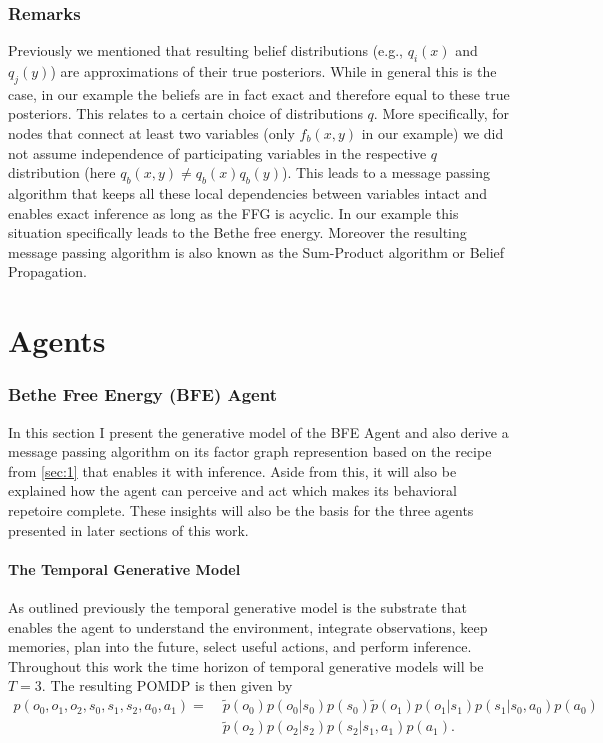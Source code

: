 \subsection{Remarks}
Previously we mentioned that resulting belief distributions (e.g., \(q_i(x)\) and \(q_j(y)\)) are approximations of their true posteriors. While in general this is the case, in our example the beliefs are in fact exact and therefore equal to these true posteriors. This relates to a certain choice of distributions \(q\). More specifically, for nodes that connect at least two variables (only \(f_b(x,y)\) in our example) we did not assume independence of participating variables in the respective \(q\) distribution (here \(q_b(x,y) \neq q_b(x)q_b(y)\)). This leads to a message passing algorithm that keeps all these local dependencies between variables intact and enables exact inference as long as the FFG is acyclic. In our example this situation specifically leads to the Bethe free energy. Moreover the resulting message passing algorithm is also known as the Sum-Product algorithm or Belief Propagation.


\chapter{Agents}

\subsection{Bethe Free Energy (BFE) Agent}

In this section I present the generative model of the BFE Agent and also derive a message passing algorithm on its factor graph represention based on the recipe from \cref{sec:1} that enables it with inference. Aside from this, it will also be explained how the agent can perceive and act which makes its behavioral repetoire complete. These insights will also be the basis for the three agents presented in later sections of this work.

\subsubsection{The Temporal Generative Model}

As outlined previously the temporal generative model is the substrate that enables the agent to understand the environment, integrate observations, keep memories, plan into the future, select useful actions, and perform inference. Throughout this work the time horizon of temporal generative models will be \(T=3\). The resulting POMDP is then given by
\begin{equation}
    \begin{split}
        p(o_0, o_1, o_2, s_0, s_1, s_2, a_0, a_1) = \; & \tilde{p}(o_0) p(o_0|s_0) p(s_0) \tilde{p}(o_1) p(o_1|s_1) p(s_1|s_0,a_0) p(a_0) \\
                                                       & \tilde{p}(o_2) p(o_2|s_2) p(s_2|s_1,a_1) p(a_1).
        \label{eq:15}
    \end{split}
\end{equation}

